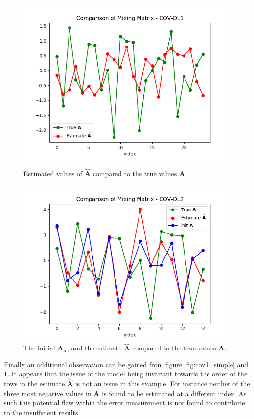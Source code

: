 \begin{figure}[H]
    \begin{minipage}[t]{.45\textwidth}
		\centering
		\includegraphics[scale=0.5]{figures/ch_6/COV1_simple.png}
		\caption{Estimated values of $\hat{\mathbf{A}}$ compared to the true 				values $\mathbf{A}$}
		\label{fig:cov1_simple}
    \end{minipage} 
    \hfill
    \begin{minipage}[t]{.45\textwidth}
        \centering
		\includegraphics[scale=0.5]{figures/ch_6/COV2_simple.png}
		\caption{The initial $\mathbf{A}_{\text{ini}}$ and the estimate $\hat{\mathbf{A}}$ 				compared to the true values $\mathbf{A}$. }
		\label{fig:cov2_simple}
    \end{minipage}
\end{figure}
Finally an additional observation can be gained from figure \ref{fig:cov1_simple} and \ref{fig:cov2_simple}. It appears that the issue of the model being invariant towards the order of the rows in the estimate $\hat{\textbf{A}}$ is not an issue in this example. For instance neither of the three most negative values in $\textbf{A}$ is found to be estimated at a different index. As such this potential flaw within the error measurement is not found to contribute to the insufficient results. 

